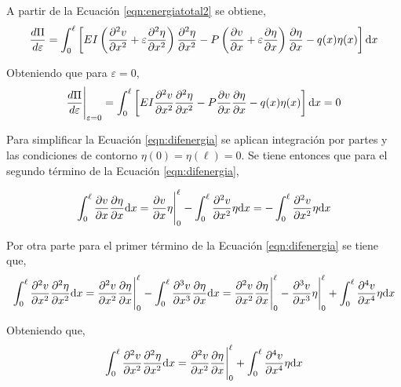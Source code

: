 A partir de la Ecuación \eqref{eqn:energiatotal2} se obtiene,
\begin{equation}
\frac{d\Pi}{d\varepsilon} = \int_0^\ell \left[ EI \left( \frac{\partial^2 v}{\partial x^2} + \varepsilon\frac{\partial^2 \eta}{\partial x^2} \right) \frac{\partial^2 \eta}{\partial x^2} - P \left(\frac{\partial v}{\partial x} + \varepsilon\frac{\partial \eta}{\partial x}\right)\frac{\partial \eta}{\partial x}- q(x) \eta(x) \right] {\text{d}} x
\end{equation}

Obteniendo que para $\varepsilon=0$,
\begin{equation}\label{eqn:difenergia}
\frac{d\Pi}{d\varepsilon} \Bigg|_{\varepsilon=0} = \int_0^\ell \left[ EI \frac{\partial^2 v}{\partial x^2} \frac{\partial^2 \eta}{\partial x^2} - P \frac{\partial v}{\partial x}\frac{\partial \eta}{\partial x}- q(x) \eta(x) \right] {\text{d}} x = 0
\end{equation}

Para simplificar la Ecuación \eqref{eqn:difenergia} se aplican integración por partes y las condiciones de contorno $\eta(0)=\eta(\ell)=0$. Se tiene entonces que para el segundo término de la Ecuación \eqref{eqn:difenergia},

\begin{equation}\label{eqn:partes1}
\int_0^\ell \frac{\partial v}{\partial x} \frac{\partial \eta}{\partial x}{\text{d}} x = \frac{\partial v}{\partial x}\eta\Bigg|_0^\ell - \int_0^\ell \frac{\partial^2 v}{\partial x^2} \eta{\text{d}} x 
= -\int_0^\ell \frac{\partial^2 v}{\partial x^2} \eta{\text{d}} x
\end{equation}

Por otra parte para el primer término de la Ecuación \eqref{eqn:difenergia} se tiene que,
$$
\int_0^\ell \frac{\partial^2 v}{\partial x^2} \frac{\partial^2 \eta}{\partial x^2}{\text{d}} x = \frac{\partial^2 v}{\partial x^2} \frac{\partial \eta}{\partial x}\Bigg|_0^\ell - \int_0^\ell \frac{\partial^3 v}{\partial x^3} \frac{\partial \eta}{\partial x}{\text{d}} x = \frac{\partial^2 v}{\partial x^2} \frac{\partial \eta}{\partial x}\Bigg|_0^\ell - \frac{\partial^3 v}{\partial x^3}\eta\Bigg|_0^\ell + \int_0^\ell \frac{\partial^4 v}{\partial x^4} \eta{\text{d}} x
$$

Obteniendo que,
\begin{equation}\label{eqn:partes2}
\int_0^\ell \frac{\partial^2 v}{\partial x^2} \frac{\partial^2 \eta}{\partial x^2}{\text{d}} x = \frac{\partial^2 v}{\partial x^2} \frac{\partial \eta}{\partial x}\Bigg|_0^\ell + \int_0^\ell \frac{\partial^4 v}{\partial x^4} \eta {\text{d}} x
\end{equation}


